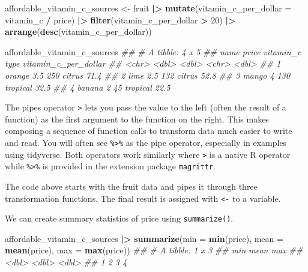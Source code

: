 \documentclass[
  notitlepage]{book}
\newenvironment{Shaded}{\begin{snugshade}}{\end{snugshade}}
\newcommand{\CommentTok}[1]{\textcolor[rgb]{0.56,0.35,0.01}{\textit{#1}}}
\newcommand{\DataTypeTok}[1]{\textcolor[rgb]{0.13,0.29,0.53}{#1}}
\newcommand{\DecValTok}[1]{\textcolor[rgb]{0.00,0.00,0.81}{#1}}
\newcommand{\ErrorTok}[1]{\textcolor[rgb]{0.64,0.00,0.00}{\textbf{#1}}}
\newcommand{\KeywordTok}[1]{\textcolor[rgb]{0.13,0.29,0.53}{\textbf{#1}}}
\newcommand{\NormalTok}[1]{#1}
\newcommand{\OperatorTok}[1]{\textcolor[rgb]{0.81,0.36,0.00}{\textbf{#1}}}
\newcommand{\StringTok}[1]{\textcolor[rgb]{0.31,0.60,0.02}{#1}}
\begin{document}
\begin{Shaded}
\begin{Highlighting}[]
\NormalTok{affordable\_vitamin\_c\_sources \textless{}{-}}\StringTok{ }\NormalTok{fruit }\OperatorTok{|}\ErrorTok{\textgreater{}}
\StringTok{  }\KeywordTok{mutate}\NormalTok{(}\DataTypeTok{vitamin\_c\_per\_dollar =}\NormalTok{ vitamin\_c }\OperatorTok{/}\StringTok{ }\NormalTok{price) }\OperatorTok{|}\ErrorTok{\textgreater{}}\StringTok{ }
\StringTok{  }\KeywordTok{filter}\NormalTok{(vitamin\_c\_per\_dollar }\OperatorTok{\textgreater{}}\StringTok{ }\DecValTok{20}\NormalTok{) }\OperatorTok{|}\ErrorTok{\textgreater{}}
\StringTok{  }\KeywordTok{arrange}\NormalTok{(}\KeywordTok{desc}\NormalTok{(vitamin\_c\_per\_dollar))}

\NormalTok{affordable\_vitamin\_c\_sources }
\CommentTok{\#\# \# A tibble: 4 x 5}
\CommentTok{\#\#   name   price vitamin\_c type     vitamin\_c\_per\_dollar}
\CommentTok{\#\#   \textless{}chr\textgreater{}  \textless{}dbl\textgreater{}     \textless{}dbl\textgreater{} \textless{}chr\textgreater{}                   \textless{}dbl\textgreater{}}
\CommentTok{\#\# 1 orange   3.5       250 citrus                   71.4}
\CommentTok{\#\# 2 lime     2.5       132 citrus                   52.8}
\CommentTok{\#\# 3 mango    4         130 tropical                 32.5}
\CommentTok{\#\# 4 banana   2          45 tropical                 22.5}
\end{Highlighting}
\end{Shaded}

The pipes operator \texttt{\textbar{}\textgreater{}} lets you pass the value to the left (often the
result of a function) as the first argument to the function on the
right. This makes composing a sequence of function calls to transform
data much easier to write and read.
You will often see \texttt{\%\textgreater{}\%} as the pipe operator, especially in examples using
tidyverse. Both operators work similarly where \texttt{\textbar{}\textgreater{}} is a native R operator
while \texttt{\%\textgreater{}\%} is provided in the extension package \texttt{magrittr}.

The code above starts with the fruit
data and pipes it through three transformation functions. The final
result is assigned with \texttt{\textless{}-} to a variable.

We can create summary statistics of price using \texttt{summarize()}.

\begin{Shaded}
\begin{Highlighting}[]
\NormalTok{affordable\_vitamin\_c\_sources }\OperatorTok{|}\ErrorTok{\textgreater{}}\StringTok{ }
\StringTok{  }\KeywordTok{summarize}\NormalTok{(}\DataTypeTok{min =} \KeywordTok{min}\NormalTok{(price), }
            \DataTypeTok{mean =} \KeywordTok{mean}\NormalTok{(price), }
            \DataTypeTok{max =} \KeywordTok{max}\NormalTok{(price))}
\CommentTok{\#\# \# A tibble: 1 x 3}
\CommentTok{\#\#     min  mean   max}
\CommentTok{\#\#   \textless{}dbl\textgreater{} \textless{}dbl\textgreater{} \textless{}dbl\textgreater{}}
\CommentTok{\#\# 1     2     3     4}
\end{Highlighting}
\end{Shaded}
\end{document}
